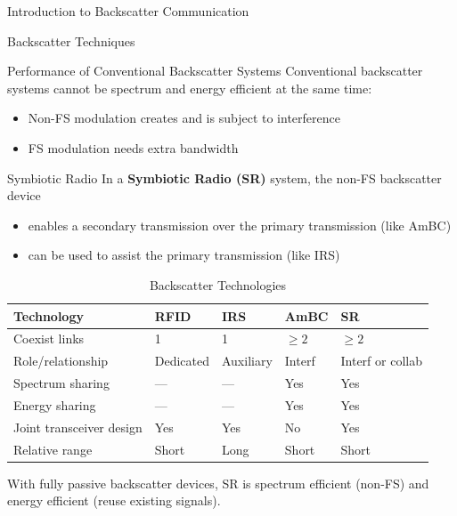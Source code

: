 \documentclass[9pt]{beamer}
\begin{document}
\begin{section}{Introduction to Backscatter Communication}
\begin{subsection}{Backscatter Techniques}
\begin{frame}{Performance of Conventional Backscatter Systems}
				Conventional backscatter systems cannot be spectrum and energy efficient at the same time:
				\begin{itemize}
					\item Non-FS modulation creates and is subject to interference
					\item FS modulation needs extra bandwidth
				\end{itemize}
			\end{frame}

			\begin{frame}{Symbiotic Radio}
				In a \textbf{Symbiotic Radio (SR)} system, the non-FS backscatter device
				\begin{itemize}
					\item enables a secondary transmission over the primary transmission (like AmBC)
					\item can be used to assist the primary transmission (like IRS)
				\end{itemize}
				\begin{table}
					\small
					\caption{Backscatter Technologies}
					\begin{tabular}{|l|l|l|l|l|}
						\hline
						Technology               & RFID      & IRS    & AmBC         & SR                            \\ \hline
						Coexist links          & 1         & 1      & $\ge 2$       & $\ge 2$                        \\ \hline
						Role/relationship        & Dedicated & Auxiliary & Interf & Interf or collab \\ \hline
						Spectrum sharing         & ---       & ---    & Yes          & Yes                           \\ \hline
						Energy sharing           & ---       & ---    & Yes          & Yes                           \\ \hline
						Joint transceiver design & Yes       & Yes    & No           & Yes                           \\ \hline
						Relative range           & Short     & Long   & Short        & Short                          \\ \hline
					\end{tabular}
				\end{table}
				With fully passive backscatter devices, SR is spectrum efficient (non-FS) and energy efficient (reuse existing signals).
			\end{frame}
		\end{subsection}
	\end{section}
\end{document}
